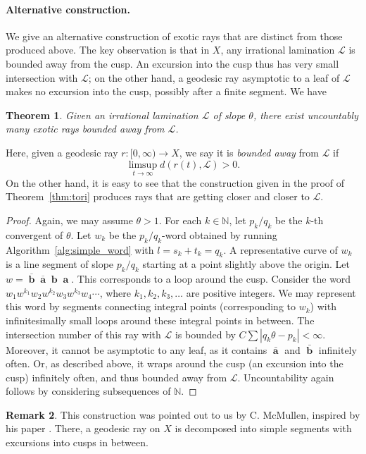 \documentclass[11pt]{article} %
\theoremstyle{plain}
\newtheorem{thm}{Theorem}[section]
\theoremstyle{definition}
\newtheorem{rmk}[thm]{Remark}
\DeclareMathOperator{\bolda}{\mathbf{a}}
\DeclareMathOperator{\boldb}{\mathbf{b}}
\numberwithin{equation}{section}
\begin{document}
\paragraph{Alternative construction.}
We give an alternative construction of exotic rays that are distinct from those produced above. The key observation is that in $X$, any irrational lamination $\mathcal{L}$ is bounded away from the cusp. An excursion into the cusp thus has very small intersection with $\mathcal{L}$; on the other hand, a geodesic ray asymptotic to a leaf of $\mathcal{L}$ makes no excursion into the cusp, possibly after a finite segment. We have
\begin{thm}\label{thm:tori_alt}
Given an irrational lamination $\mathcal{L}$ of slope $\theta$, there exist uncountably many exotic rays bounded away from $\mathcal{L}$.
\end{thm}
Here, given a geodesic ray $r:[0,\infty)\to X$, we say it is \emph{bounded away} from $\mathcal{L}$ if
$$\limsup_{t\to\infty} d(r(t),\mathcal{L})>0.$$
On the other hand, it is easy to see that the construction given in the proof of Theorem~\ref{thm:tori} produces rays that are getting closer and closer to $\mathcal{L}$.
\begin{proof}
Again, we may assume $\theta>1$. For each $k\in\mathbb{N}$, let $p_k/q_k$ be the $k$-th convergent of $\theta$. Let $w_k$ be the $p_k/q_k$-word obtained by running Algorithm~\ref{alg:simple_word} with $l=s_k+t_k=q_k$. A representative curve of $w_k$ is a line segment of slope $p_k/q_k$ starting at a point slightly above the origin. Let $w=\overline{\boldb}\overline{\bolda}\boldb\bolda$. This corresponds to a loop around the cusp. Consider the word $w_1w^{k_1}w_2w^{k_2}w_3w^{k_3}w_4\cdots$, where $k_1,k_2,k_3,\ldots$ are positive integers. We may represent this word by segments connecting integral points (corresponding to $w_k$) with infinitesimally small loops around these integral points in between. The intersection number of this ray with $\mathcal{L}$ is bounded by $C\sum |q_k\theta-p_k|<\infty$. Moreover, it cannot be asymptotic to any leaf, as it contains $\bar{\bolda}$ and $\bar{\boldb}$ infinitely often. Or, as described above, it wraps around the cusp (an excursion into the cusp) infinitely often, and thus bounded away from $\mathcal{L}$. Uncountability again follows by considering subsequences of $\mathbb{N}$.
\end{proof}
\begin{rmk}
This construction was pointed out to us by C. McMullen, inspired by his paper \cite{local_connectivity}. There, a geodesic ray on $X$ is decomposed into simple segments with excursions into cusps in between.
\end{rmk}
\end{document}
